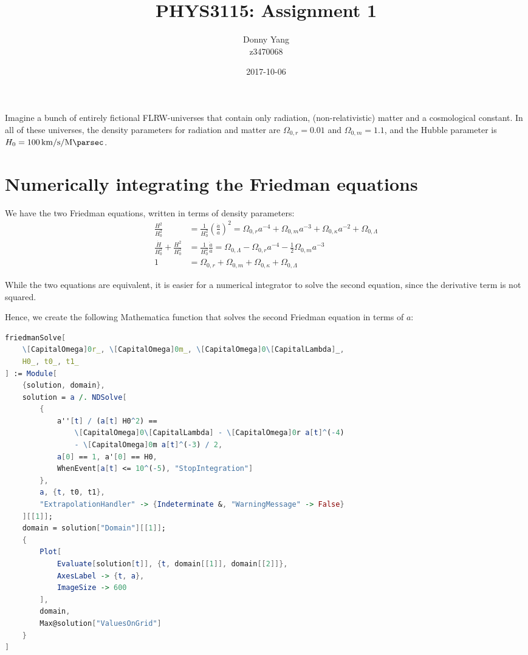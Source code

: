 \documentclass[a4paper]{scrartcl}
\begin{document}
\title{PHYS3115: Assignment 1}
\author{Donny Yang \\ z3470068}
\date{2017-10-06}
\maketitle

Imagine a bunch of entirely fictional FLRW-universes that contain only radiation, (non-relativistic) matter and a cosmological constant. In all of these universes, the density parameters for radiation and matter are \(\Omega_{0, r} = 0.01\) and \(\Omega_{0, m} = 1.1\), and the Hubble parameter is \(H_0 = \SI{100}{\kilo\metre\per\second\per\mega\parsec}\).

\section{Numerically integrating the Friedman equations}
We have the two Friedman equations, written in terms of density parameters:
\begin{align*}
    \frac{H^2}{H_0^2} &= \frac{1}{H_0^2} \left(\frac{\dot{a}}{a}\right)^2 = \Omega_{0, r} a^{-4} + \Omega_{0, m} a^{-3} + \Omega_{0, \kappa} a^{-2} + \Omega_{0, \Lambda} \\
    \frac{\dot{H}}{H_0^2} + \frac{H^2}{H_0^2} &= \frac{1}{H_0^2} \frac{\ddot{a}}{a} = \Omega_{0, \Lambda} - \Omega_{0, r} a^{-4} - \frac{1}{2} \Omega_{0, m} a^{-3} \\
    1 &= \Omega_{0, r} + \Omega_{0, m} + \Omega_{0, \kappa} + \Omega_{0, \Lambda}
\end{align*}

While the two equations are equivalent, it is easier for a numerical integrator to solve the second equation, since the derivative term is not squared.

Hence, we create the following Mathematica function that solves the second Friedman equation in terms of \(a\):
\begin{lstlisting}[language = Mathematica, frame = single]
friedmanSolve[
    \[CapitalOmega]0r_, \[CapitalOmega]0m_, \[CapitalOmega]0\[CapitalLambda]_,
    H0_, t0_, t1_
] := Module[
    {solution, domain},
    solution = a /. NDSolve[
        {
            a''[t] / (a[t] H0^2) ==
                \[CapitalOmega]0\[CapitalLambda] - \[CapitalOmega]0r a[t]^(-4)
                - \[CapitalOmega]0m a[t]^(-3) / 2, 
            a[0] == 1, a'[0] == H0,
            WhenEvent[a[t] <= 10^(-5), "StopIntegration"]
        },
        a, {t, t0, t1},
        "ExtrapolationHandler" -> {Indeterminate &, "WarningMessage" -> False}
    ][[1]];
    domain = solution["Domain"][[1]];
    {
        Plot[
            Evaluate[solution[t]], {t, domain[[1]], domain[[2]]},
            AxesLabel -> {t, a},
            ImageSize -> 600
        ],
        domain,
        Max@solution["ValuesOnGrid"]
    }
]
\end{lstlisting}
\end{document}
